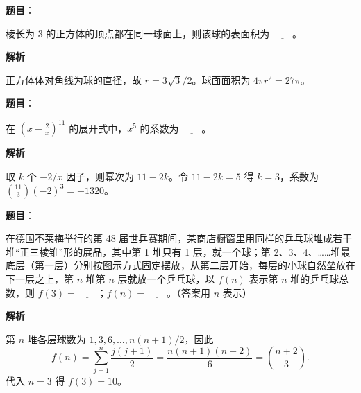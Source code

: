 \begin{answer}

\textbf{题目}：

棱长为 3 的正方体的顶点都在同一球面上，则该球的表面积为 \(\underline{\qquad}\)。

\textbf{解析}

正方体体对角线为球的直径，故 $r=3\sqrt3/2$。球面面积为 $4\pi r^2=27\pi$。


\end{answer}
\begin{answer}

\textbf{题目}：

在 \(\left(x-\frac2x\right)^{11}\) 的展开式中，\(x^5\) 的系数为 \(\underline{\qquad}\)。

\textbf{解析}

取 $k$ 个 $-2/x$ 因子，则幂次为 $11-2k$。令 $11-2k=5$ 得 $k=3$，系数为 $\binom{11}{3}(-2)^3=-1320$。


\end{answer}
\begin{answer}

\textbf{题目}：

在德国不莱梅举行的第 48 届世乒赛期间，某商店橱窗里用同样的乒乓球堆成若干堆“正三棱锥”形的展品，其中第 1 堆只有 1 层，就一个球；第 2、3、4、……堆最底层（第一层）分别按图示方式固定摆放，从第二层开始，每层的小球自然垒放在下一层之上，第 \(n\) 堆第 \(n\) 层就放一个乒乓球，以 \(f(n)\) 表示第 \(n\) 堆的乒乓球总数，则 \(f(3)=\underline{\qquad}\)；\(f(n)=\underline{\qquad}\)。（答案用 \(n\) 表示）
\nopagebreak[4]
\begin{center}\end{center}
\nopagebreak[4]
\textbf{解析}

第 $n$ 堆各层球数为 $1,3,6,\ldots,n(n+1)/2$，因此
\nopagebreak[4]
\[
f(n)=\sum_{j=1}^n\frac{j(j+1)}2=\frac{n(n+1)(n+2)}6=\binom{n+2}{3}.
\]
代入 $n=3$ 得 $f(3)=10$。


\end{answer}
